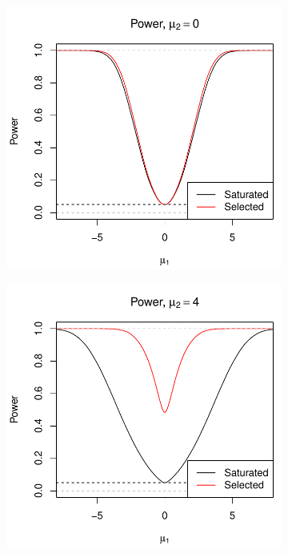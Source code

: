 \documentclass{article}
\begin{document}
\begin{figure}
  \centering
  \begin{subfigure}[t]{.4\textwidth}
    \includegraphics[width=\textwidth]{figs/bivariateSelVSat_powCurves_0.pdf}
    \caption{}
    \label{fig:bv_powCurves_0}
  \end{subfigure}
  \hspace{.1\textwidth}
  \begin{subfigure}[t]{.4\textwidth}
    \includegraphics[width=\textwidth]{figs/bivariateSelVSat_powCurves_4.pdf}
    \caption{}
  \end{subfigure}
  \caption{}
   \label{fig:bv_powCurves_4}
\end{figure}
\end{document}
